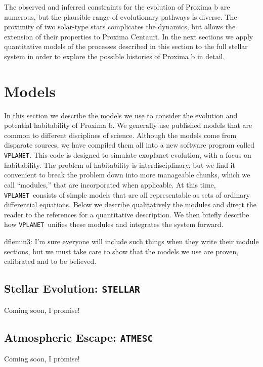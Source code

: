 \documentclass[preprint,12pt]{aastex}
\newcommand{\xxx}[1]{{\color{red} #1}} %
\newcommand{\xxx}[1]{{\color{red} #1}} %
\def\vplanet{\texttt{\footnotesize{VPLANET}}\xspace}
\def\atmesc{\texttt{\footnotesize{ATMESC}}\xspace}
\def\stellar{\texttt{\footnotesize{STELLAR}}\xspace}
\begin{document}
The observed and inferred constraints for the evolution of Proxima b
are numerous, but the plausible range of evolutionary pathways is
diverse. The proximity of two solar-type stars complicates the
dynamics, but allows the extension of their properties to Proxima
Centauri. In the next sections we apply quantitative models of the
processes described in this section to the full stellar system in order to
explore the possible histories of Proxima b in detail.


\section{Models\label{sec:models}}

In this section we describe the models we use to consider the
evolution and potential habitability of Proxima b. We generally use
published models that are common to different disciplines of
science. Although the models come from disparate sources, we have
compiled them all into a new software program called \vplanet. This
code is designed to simulate exoplanet evolution, with a focus on
habitability. The problem of habitability is interdisciplinary, but we
find it convenient to break the problem down into more manageable
chunks, which we call ``modules,'' that are incorporated when
applicable. At this time, \vplanet~consists of simple models that are
all representable as sets of ordinary differential equations. Below we
describe qualitatively the modules and direct the reader to the
references for a quantitative description. We then briefly describe
how \vplanet~unifies these modules and integrates the system forward.

\xxx{dflemin3: I'm sure everyone will include such things when they write their module sections, but we must take
care to show that the models we use are proven, calibrated and to be believed.}

\subsection{Stellar Evolution: \stellar}
\label{sec:models:stellar}
\xxx{Coming soon, I promise!}

\subsection{Atmospheric Escape: \atmesc}
\label{sec:models:atmesc}
\xxx{Coming soon, I promise!}
\end{document}
